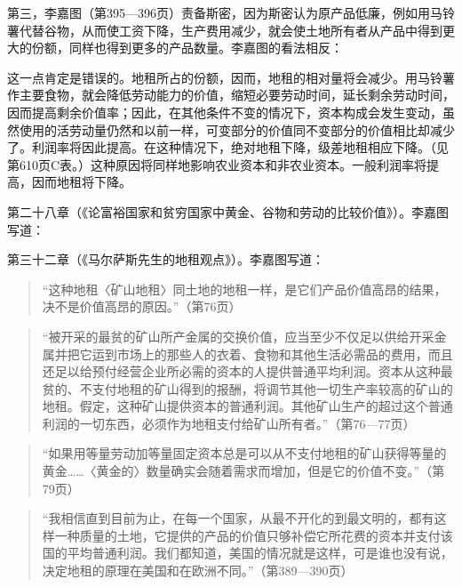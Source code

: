 第三，李嘉图（第395—396页）责备斯密，因为斯密认为原产品低廉，例如用马铃薯代替谷物，从而使工资下降，生产费用减少，就会使土地所有者从产品中得到更大的份额，同样也得到更多的产品数量。李嘉图的看法相反：



这一点肯定是错误的。地租所占的份额，因而，地租的相对量将会减少。用马铃薯作主要食物，就会降低劳动能力的价值，缩短必要劳动时间，延长剩余劳动时间，因而提高剩余价值率；因此，在其他条件不变的情况下，资本构成会发生变动，虽然使用的活劳动量仍然和以前一样，可变部分的价值同不变部分的价值相比却减少了。利润率将因此提高。在这种情况下，绝对地租下降，级差地租相应下降。（见第610页C表。）这种原因将同样地影响农业资本和非农业资本。一般利润率将提高，因而地租将下降。

第二十八章（《论富裕国家和贫穷国家中黄金、谷物和劳动的比较价值》）。李嘉图写道：



第三十二章（《马尔萨斯先生的地租观点》）。李嘉图写道：

\begin{quote}“这种地租〈矿山地租〉同土地的地租一样，是它们产品价值高昂的结果，决不是价值高昂的原因。”（第76页）\end{quote}

\begin{quote}“被开采的最贫的矿山所产金属的交换价值，应当至少不仅足以供给开采金属并把它运到市场上的那些人的衣着、食物和其他生活必需品的费用，而且还足以给预付经营企业所必需的资本的人提供普通平均利润。资本从这种最贫的、不支付地租的矿山得到的报酬，将调节其他一切生产率较高的矿山的地租。假定，这种矿山提供资本的普通利润。其他矿山生产的超过这个普通利润的一切东西，必须作为地租支付给矿山所有者。”（第76—77页）\end{quote}

\begin{quote}“如果用等量劳动加等量固定资本总是可以从不支付地租的矿山获得等量的黄金……〈黄金的〉数量确实会随着需求而增加，但是它的价值不变。”（第79页）\end{quote}

\begin{quote}“我相信直到目前为止，在每一个国家，从最不开化的到最文明的，都有这样一种质量的土地，它提供的产品的价值只够补偿它所花费的资本并支付该国的平均普通利润。我们都知道，美国的情况就是这样，可是谁也没有说，决定地租的原理在美国和在欧洲不同。”（第389—390页）\end{quote}

